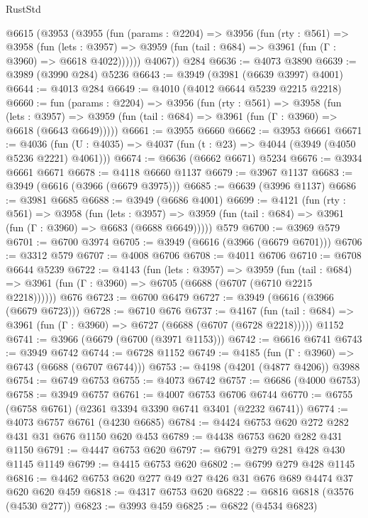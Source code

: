 \begin{lexlean}{RustStd}
\begin{coremodule}
    @6615
      (@3953
        (@3955
          (fun (params : @2204) =>
          @3956
            (fun (rty : @561) =>
            @3958
              (fun (lets : @3957) =>
              @3959 (fun (tail : @684) => @3961 (fun (Γ : @3960) => @6618 @4022))))))
        @4067))
    @284
@6636 := @4073 @3890
@6639 := @3989 (@3990 @284) @5236
@6643 := @3949 (@3981 (@6639 @3997) @4001)
@6644 := @4013 @284
@6649 := @4010 (@4012 @6644 @5239 @2215 @2218)
@6660 := fun (params : @2204) =>
  @3956
    (fun (rty : @561) =>
    @3958
      (fun (lets : @3957) =>
      @3959 (fun (tail : @684) => @3961 (fun (Γ : @3960) => @6618 (@6643 @6649)))))
@6661 := @3955 @6660
@6662 := @3953 @6661
@6671 := @4036 (fun (U : @4035) => @4037 (fun (t : @23) => @4044 (@3949 (@4050 @5236 @2221) @4061)))
@6674 := @6636 (@6662 @6671) @5234
@6676 := @3934 @6661 @6671
@6678 := @4118 @6660 @1137
@6679 := @3967 @1137
@6683 := @3949 (@6616 (@3966 (@6679 @3975)))
@6685 := @6639 (@3996 @1137)
@6686 := @3981 @6685
@6688 := @3949 (@6686 @4001)
@6699 := @4121
    (fun (rty : @561) =>
    @3958
      (fun (lets : @3957) =>
      @3959 (fun (tail : @684) => @3961 (fun (Γ : @3960) => @6683 (@6688 @6649)))))
    @579
@6700 := @3969 @579
@6701 := @6700 @3974
@6705 := @3949 (@6616 (@3966 (@6679 @6701)))
@6706 := @3312 @579
@6707 := @4008 @6706
@6708 := @4011 @6706
@6710 := @6708 @6644 @5239
@6722 := @4143
    (fun (lets : @3957) =>
    @3959
      (fun (tail : @684) => @3961 (fun (Γ : @3960) => @6705 (@6688 (@6707 (@6710 @2215 @2218))))))
    @676
@6723 := @6700 @6479
@6727 := @3949 (@6616 (@3966 (@6679 @6723)))
@6728 := @6710 @676
@6737 := @4167
    (fun (tail : @684) => @3961 (fun (Γ : @3960) => @6727 (@6688 (@6707 (@6728 @2218)))))
    @1152
@6741 := @3966 (@6679 (@6700 (@3971 @1153)))
@6742 := @6616 @6741
@6743 := @3949 @6742
@6744 := @6728 @1152
@6749 := @4185 (fun (Γ : @3960) => @6743 (@6688 (@6707 @6744)))
@6753 := @4198 (@4201 (@4877 @4206)) @3988
@6754 := @6749 @6753
@6755 := @4073 @6742
@6757 := @6686 (@4000 @6753)
@6758 := @3949 @6757
@6761 := @4007 @6753 @6706 @6744
@6770 := @6755 (@6758 @6761) (@2361 @3394 @3390 @6741 @3401 (@2232 @6741))
@6774 := @4073 @6757 @6761 (@4230 @6685)
@6784 := @4424 @6753 @620 @272 @282 @431 @31 @676 @1150 @620 @453
@6789 := @4438 @6753 @620 @282 @431 @1150
@6791 := @4447 @6753 @620
@6797 := @6791 @279 @281 @428 @430 @1145 @1149
@6799 := @4415 @6753 @620
@6802 := @6799 @279 @428 @1145
@6816 := @4462 @6753 @620 @277 @49 @27 @426 @31 @676 @689 @4474 @37 @620 @620 @459
@6818 := @4317 @6753 @620
@6822 := @6816 @6818 (@3576 (@4530 @277))
@6823 := @3993 @459
@6825 := @6822 (@4534 @6823)

\end{coremodule}
\end{lexlean}
